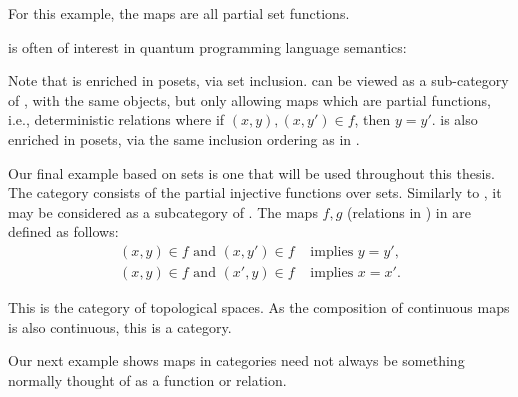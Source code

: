 \begin{example}[\Par]\label{ex:category_par}
For this example, the maps are all partial set functions.
\end{example}

\begin{example}[\rel]\label{ex:category_rel}
\rel is often of interest in quantum programming language semantics:
\end{example}

Note that \rel is enriched in posets, via set inclusion. \Par can be viewed as a sub-category of
\rel, with the same objects, but only allowing maps which are partial functions, i.e., deterministic
relations where if $(x,y), (x,y') \in f$, then $y = y'$. \Par is also enriched in posets, via the
same inclusion ordering as in \rel.

\begin{example}[\pinj]\label{ex:category_pinj}
Our final example based on sets is one that will be used throughout this thesis. The category \pinj consists of
the partial injective functions over sets. Similarly to \Par, it may be considered as a subcategory
of \rel. The maps $f,g$ (relations in \rel) in \pinj are defined as follows:
\begin{align}
   (x,y)\in f\text{ and }(x,y')\in f & \text{ implies } y = y',\label{eq:pinj_relation_is_a_function}\\
   (x,y)\in f\text{ and }(x',y)\in f & \text{ implies } x = x'.\label{eq:pinj_converse_relation_is_a_function}
\end{align}
\end{example}

\begin{example}[\topcat]\label{ex:category_top}
  This is the category of topological spaces.
  As the composition of continuous maps is also continuous, this is a category.
\end{example}

Our next example shows maps in categories need not always be something normally thought of as a
function or relation.

